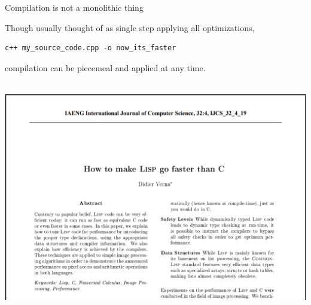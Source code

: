 \documentclass[aspectratio=169]{beamer}
\begin{document}
\begin{frame}[fragile]{Compilation is not a monolithic thing}
\Large

\vspace{0.5 cm}
Though usually thought of as single step applying all optimizations,

\vspace{0.2 cm}
\hspace{0.6 cm} \begin{minipage}{0.9\linewidth}
\begin{verbatim}
c++ my_source_code.cpp -o now_its_faster
\end{verbatim}
\end{minipage}

\vspace{0.25 cm}
compilation can be piecemeal and applied at any time.

\vspace{0.5 cm}

\mbox{ } \hfill \includegraphics[height=5 cm]{lisp-faster-than-c.png} \hfill \mbox{ }
\end{frame}
\end{document}
